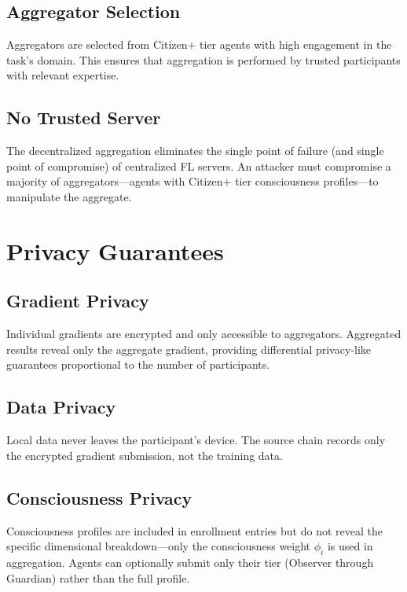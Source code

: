\documentclass[11pt,twocolumn]{article}
\begin{document}
\subsection{Aggregator Selection}

Aggregators are selected from Citizen+ tier agents with high engagement
in the task's domain. This ensures that aggregation is performed by
trusted participants with relevant expertise.

\subsection{No Trusted Server}

The decentralized aggregation eliminates the single point of failure
(and single point of compromise) of centralized FL servers. An attacker
must compromise a majority of aggregators---agents with Citizen+ tier
consciousness profiles---to manipulate the aggregate.

\section{Privacy Guarantees}

\subsection{Gradient Privacy}

Individual gradients are encrypted and only accessible to aggregators.
Aggregated results reveal only the aggregate gradient, providing
differential privacy-like guarantees proportional to the number of
participants.

\subsection{Data Privacy}

Local data never leaves the participant's device. The source chain
records only the encrypted gradient submission, not the training data.

\subsection{Consciousness Privacy}

Consciousness profiles are included in enrollment entries but do not
reveal the specific dimensional breakdown---only the consciousness weight
$\phi_i$ is used in aggregation. Agents can optionally submit only their
tier (Observer through Guardian) rather than the full profile.
\end{document}

